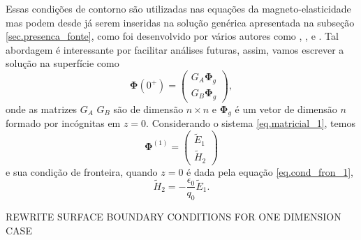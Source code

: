 Essas condi\c{c}\~oes de contorno s\~ao utilizadas nas equa\c{c}\~oes da magneto-elasticidade mas podem desde j\'a serem inseridas na solu\c{c}\~ao gen\'erica apresentada na subse\c{c}\~ao \ref{sec.presenca_fonte}, como foi desenvolvido por v\'arios autores como \cite{White_Zhou_2006}, \cite{Azeredo_2013}, \cite{miranda_2016} e \cite{oliveira_2018}. Tal abordagem \'e interessante por facilitar an\'alises futuras, assim, vamos escrever a solu\c{c}\~ao na superf\'icie como
\begin{equation}\label{eq.Phi_G_AB}
\mathbf{\Phi}(0^+)=
\begin{pmatrix}
G_A\mathbf{\Phi}_g\\
G_B\mathbf{\Phi}_g
\end{pmatrix},
\end{equation}
onde as matrizes $G_A$ $G_B$ s\~ao de dimens\~ao $n\times n$ e $\mathbf{\Phi}_g$ \'e um vetor de dimens\~ao $n$ formado por inc\'ognitas em $z=0$.
Considerando o sistema \ref{eq.matricial_1}, temos
\begin{equation*}
\mathbf{\Phi}^{(1)}=
\begin{pmatrix}
\tilde{E}_1\\
\tilde{H}_2
\end{pmatrix}
\end{equation*}
e sua condi\c{c}\~ao de fronteira, quando $z=0$ \'e dada pela equa\c{c}\~ao \ref{eq.cond_fron_1}, 
\begin{equation*}
\tilde{H}_2=-\frac{\epsilon_0}{q_0}\tilde{E}_1.
\end{equation*}

REWRITE SURFACE BOUNDARY CONDITIONS FOR ONE DIMENSION CASE

